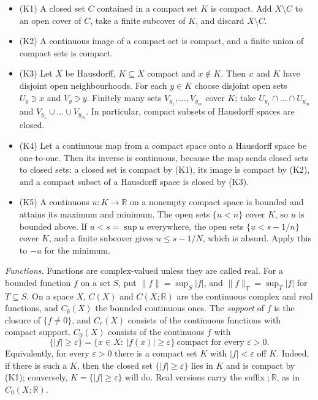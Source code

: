 \documentclass[
  english,
  11pt,
  a4paper,
]{article}
\newcounter{none} %
\providecommand{\tightlist}{%
  \setlength{\itemsep}{0pt}\setlength{\parskip}{0pt}}
\begin{document}
\begin{itemize}
\tightlist
\item
  (K1) A closed set \(C\) contained in a compact set \(K\) is compact.
  Add \(X\setminus C\) to an open cover of \(C\), take a finite subcover
  of \(K\), and discard \(X\setminus C\).
\item
  (K2) A continuous image of a compact set is compact, and a finite
  union of compact sets is compact.
\item
  (K3) Let \(X\) be Hausdorff, \(K\subseteq X\) compact and
  \(x\notin K\). Then \(x\) and \(K\) have disjoint open neighbourhoods.
  For each \(y\in K\) choose disjoint open sets \(U_y\ni x\) and
  \(V_y\ni y\). Finitely many sets \(V_{y_1},\dots,V_{y_m}\) cover
  \(K\); take \(U_{y_1}\cap\dots\cap U_{y_m}\) and
  \(V_{y_1}\cup\dots\cup V_{y_m}\). In particular, compact subsets of
  Hausdorff spaces are closed.
\item
  (K4) Let a continuous map from a compact space onto a Hausdorff space
  be one-to-one. Then its inverse is continuous, because the map sends
  closed sets to closed sets: a closed set is compact by (K1), its image
  is compact by (K2), and a compact subset of a Hausdorff space is
  closed by (K3).
\item
  (K5) A continuous \(u:K\to\mathbb R\) on a nonempty compact space is
  bounded and attains its maximum and minimum. The open sets \(\{u<n\}\)
  cover \(K\), so \(u\) is bounded above. If \(u<s=\sup u\) everywhere,
  the open sets \(\{u<s-1/n\}\) cover \(K\), and a finite subcover gives
  \(u\leq s-1/N\), which is absurd. Apply this to \(-u\) for the
  minimum.
\end{itemize}

\emph{Functions.} Functions are complex-valued unless they are called
real. For a bounded function \(f\) on a set \(S\), put
\(\|f\|=\sup_S|f|\), and \(\|f\|_T=\sup_T|f|\) for \(T\subseteq S\). On
a space \(X\), \(C(X)\) and \(C(X;\mathbb R)\) are the continuous
complex and real functions, and \(C_b(X)\) the bounded continuous ones.
The \emph{support} of \(f\) is the closure of \(\{f\neq0\}\), and
\(C_c(X)\) consists of the continuous functions with compact support.
\(C_0(X)\) consists of the continuous \(f\) with
\[\{|f|\geq\varepsilon\}=\{x\in X:\ |f(x)|\geq\varepsilon\}\ \text{compact for every }\varepsilon>0 .
\tag{1.1}\] Equivalently, for every \(\varepsilon>0\) there is a compact
set \(K\) with \(|f|<\varepsilon\) off \(K\). Indeed, if there is such a
\(K\), then the closed set \(\{|f|\geq\varepsilon\}\) lies in \(K\) and
is compact by (K1); conversely, \(K=\{|f|\geq\varepsilon\}\) will do.
Real versions carry the suffix \(;\mathbb R\), as in
\(C_0(X;\mathbb R)\).
\end{document}
